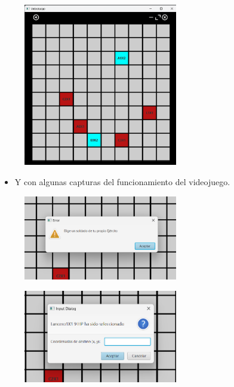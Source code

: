 \documentclass{article}
\begin{document}
	
	\begin{figure}[H]
		\centering
	\includegraphics[width=0.6\textwidth,keepaspectratio]{img/tablero.png}
	\end{figure}
	\begin{itemize}	
		\item Y con algunas capturas del funcionamiento del videojuego.
	\end{itemize}
	\begin{figure}[H]
		\centering
	\includegraphics[width=0.6\textwidth,keepaspectratio]{img/menu1.png}
	\end{figure}
	\begin{figure}[H]
		\centering
	\includegraphics[width=0.6\textwidth,keepaspectratio]{img/menu2.png}
	\end{figure}
	
\end{document}
